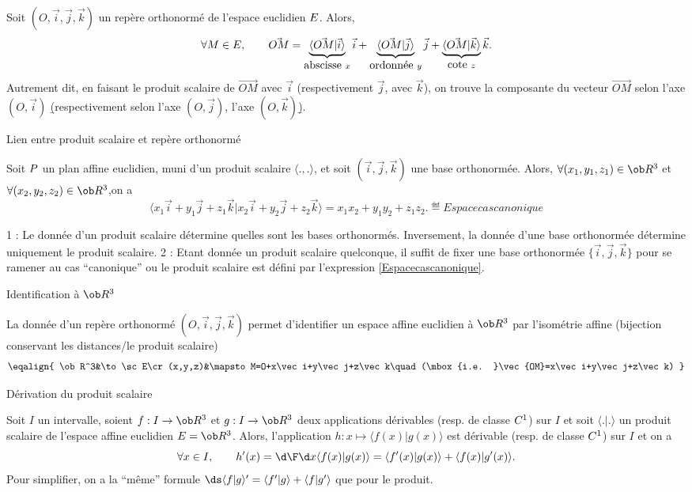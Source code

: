 \Propriete []  Soit $(O,\vec i,\vec j,\vec k)$ un rep\`ere orthonorm\'e de l'espace euclidien $\sc E$. Alors, 
$$
\forall M\in\sc E, \qquad \vec{OM}=\underbrace{\langle \vec{OM}|\vec i\rangle}_{\mbox{abscisse }x}\vec i+\underbrace{\langle \vec{OM}|\vec j\rangle}_{\mbox{ordonn\'ee }y}\vec j
+\underbrace{\langle \vec{OM}|\vec k\rangle}_{\mbox{cote }z}\vec k.
$$ 
Autrement dit, en faisant le produit scalaire de $\vec{OM}$ avec $\vec i$ (respectivement $\vec j$, avec $\vec k$), on trouve la composante du vecteur $\vec {OM}$ selon l'axe $(O,\vec i)$ \b(respectivement selon l'axe $(O,\vec j)$, 
l'axe $(O,\vec k)$\b). 


\Concept [] Lien entre produit scalaire et rep\`ere orthonorm\'e

\Propriete []   Soit  $\sc  P$  un   plan   affine   euclidien,   muni   d'un  produit  scalaire  $\langle.,.\rangle$,  et  soit
$(\vec i,\vec j,\vec k)$ une base orthonorm\'ee.  Alors, $\forall  (x_1,y_1,z_1)\in\ob  R^3$  et
$\forall(x_2,y_2,z_2)\in\ob  R^3$,on  a  
$$
\langle  x_1\vec  i+y_1\vec  j+z_1\vec k|x_2\vec i+y_2\vec j+z_2\vec k\rangle=x_1x_2+y_1y_2+z_1z_2. 
\eqdef{Espacecascanonique} 
$$

\Remarque{} 1 : Le donn\'ee d'un produit scalaire d\'etermine quelles sont les bases orthonorm\'es. Inversement, 
la donn\'ee d'une base orthonorm\'ee d\'etermine uniquement le produit scalaire. 
\bigskip
\Remarque{} 2 : Etant donn\'ee un produit scalaire quelconque, il suffit de fixer une base orthonorm\'ee $\{\vec i,\vec j,\vec k\}$ 
pour se ramener au cas ``canonique'' ou le produit scalaire est d\'efini par l'expression \eqref{Espacecascanonique}. 
\bigskip


\Concept [] Identification \`a $\ob R^3$

\noindent
La donn\'ee d'un rep\`ere orthonorm\'e $(O,\vec i,\vec j,\vec k)$ permet d'identifier un espace affine euclidien \`a $\ob R^3$ par l'isom\'etrie affine (bijection conservant les distances/le produit scalaire)
$$
\eqalign{
	\ob R^3&\to \sc E\cr 
	(x,y,z)&\mapsto  M=O+x\vec i+y\vec j+z\vec k\quad(\mbox{i.e. }\vec{OM}=x\vec i+y\vec j+z\vec k)
}
$$

\Concept [] D\'erivation du produit scalaire

\noindent
Soit $I$ un intervalle, soient $f:I\to\ob R^3$ et $g:I\to\ob R^3$ deux applications d\'erivables (resp. de classe $\sc C^1$) sur $I$ et soit $\langle.|.\rangle$ un produit scalaire de l'espace affine euclidien $\sc E=\ob R^3$. Alors, l'application $h:x\mapsto \langle f(x)|g(x)\rangle$ est d\'erivable (resp. de classe $\sc C^1$) sur $I$ et on a 
$$
\forall x\in I,\qquad h'(x)={\d\F\d x} \langle f(x)|g(x)\rangle= \langle f'(x)|g(x)\rangle+ \langle f(x)|g'(x)\rangle.
$$
Pour simplifier, on a la ``m\^eme'' formule $\ds\langle f|g\rangle'= \langle f'|g\rangle+ \langle f|g'\rangle$ que pour le produit. 

